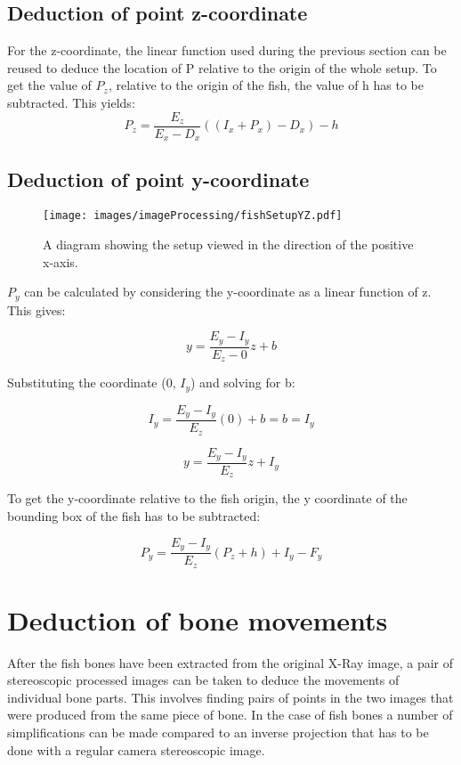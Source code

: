 \subsection{Deduction of point z-coordinate}

For the z-coordinate, the linear function used during the previous section can be reused to deduce the location of P relative to the origin of the whole setup. To get the value of $P_{z}$, relative to the origin of the fish, the value of h has to be subtracted. This yields:
\begin{equation} \label{eq:fishzcoordinate}
P_z = \frac{E_z}{E_x - D_x}((I_x + P_x) - D_x) - h 
\end{equation}

\subsection{Deduction of point y-coordinate}

\begin{figure}
	\centering
	\texttt{[image: images/imageProcessing/fishSetupYZ.pdf]}
	\caption{A diagram showing the setup viewed in the direction of the positive x-axis.}
	\label{fig:fishSetupXZ}
\end{figure}

$P_y$ can be calculated by considering the y-coordinate as a linear function of z. This gives:

\begin{equation}
y = \frac{E_y - I_y}{E_z - 0}z + b
\end{equation}

Substituting the coordinate (0, $I_y$) and solving for b:

\begin{equation}
I_y = \frac{E_y - I_y}{E_z}(0) + b = b = I_y
\end{equation}

\begin{equation}
y = \frac{E_y - I_y}{E_z}z + I_y
\end{equation}

To get the y-coordinate relative to the fish origin, the y coordinate of the bounding box of the fish has to be subtracted:

\begin{equation}
P_y = \frac{E_y - I_y}{E_z}(P_z + h) + I_y - F_y
\end{equation}

\section{Deduction of bone movements}
After the fish bones have been extracted from the original X-Ray image, a pair of stereoscopic processed images can be taken to deduce the movements of individual bone parts. This involves finding pairs of points in the two images that were produced from the same piece of bone. In the case of fish bones a number of simplifications can be made compared to an inverse projection that has to be done with a regular camera stereoscopic image.

